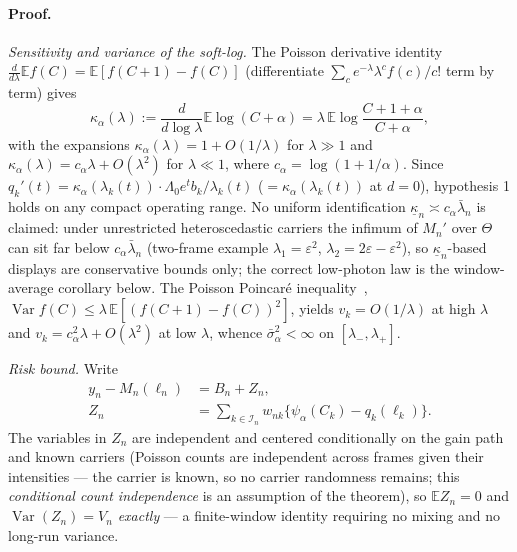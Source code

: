 \paragraph{Proof.} \emph{Sensitivity and variance of the soft-log.} The Poisson derivative identity $\frac{d}{d\lambda}\mathbb{E}f(C)=\mathbb{E}[f(C{+}1)-f(C)]$ (differentiate $\sum_c e^{-\lambda}\lambda^c f(c)/c!$ term by term) gives
\[
\kappa_\alpha(\lambda):=\frac{d}{d\log\lambda}\mathbb{E}\log(C+\alpha)=\lambda\,\mathbb{E}\log\frac{C+1+\alpha}{C+\alpha},
\]
with the expansions $\kappa_\alpha(\lambda)=1+O(1/\lambda)$ for $\lambda\gg1$ and $\kappa_\alpha(\lambda)=c_\alpha\lambda+O(\lambda^2)$ for $\lambda\ll1$, where $c_\alpha=\log(1+1/\alpha)$. Since $q_k'(t)=\kappa_\alpha(\lambda_k(t))\cdot\Lambda_0e^{t}b_k/\lambda_k(t)$ ($=\kappa_\alpha(\lambda_k(t))$ at $d=0$), hypothesis 1 holds on any compact operating range. No uniform identification $\underline\kappa_n\asymp c_\alpha\bar\lambda_n$ is claimed: under unrestricted heteroscedastic carriers the infimum of $M_n'$ over $\Theta$ can sit far below $c_\alpha\bar\lambda_n$ (two-frame example $\lambda_1=\varepsilon^2$, $\lambda_2=2\varepsilon-\varepsilon^2$), so $\underline\kappa_n$-based displays are conservative bounds only; the correct low-photon law is the window-average corollary below. The Poisson Poincar\'e inequality~\cite{Klaassen1985,BobkovLedoux1998}, $\operatorname{Var}f(C)\le\lambda\,\mathbb{E}[(f(C{+}1)-f(C))^2]$, yields $v_k=O(1/\lambda)$ at high $\lambda$ and $v_k=c_\alpha^2\lambda+O(\lambda^2)$ at low $\lambda$, whence $\bar\sigma_\alpha^2<\infty$ on $[\lambda_-,\lambda_+]$.

\emph{Risk bound.} Write
\[
\begin{aligned}
y_n-M_n(\ell_n)&=B_n+Z_n,\\
Z_n&=\sum_{k\in\mathcal I_n}w_{nk}
\{\psi_\alpha(C_k)-q_k(\ell_k)\}.
\end{aligned}
\]
The variables in $Z_n$ are independent and centered conditionally on the gain path and known carriers (Poisson counts are independent across frames given their intensities --- the carrier is known, so no carrier randomness remains; this \emph{conditional count independence} is an assumption of the theorem), so $\mathbb EZ_n=0$ and $\operatorname{Var}(Z_n)=V_n$ \emph{exactly} --- a finite-window identity requiring no mixing and no long-run variance.


